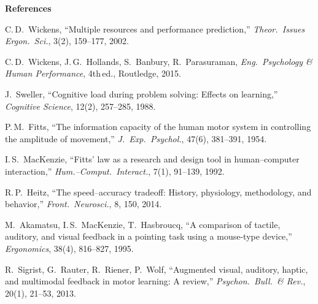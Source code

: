 \documentclass[12pt,letterpaper]{article}
\begin{document}
{\scriptsize\setlength{\parskip}{0pt}%
\textbf{References}\par\vspace{-0.2em}
\begin{enumerate}[label={[\arabic*]},leftmargin=1.5em,itemsep=0pt,parsep=0pt,topsep=0pt]
  \item C.\,D.\ Wickens, ``Multiple resources and performance prediction,'' \emph{Theor.\ Issues Ergon.\ Sci.}, 3(2), 159--177, 2002.
  \item C.\,D.\ Wickens, J.\,G.\ Hollands, S.\ Banbury, R.\ Parasuraman, \emph{Eng.\ Psychology \& Human Performance}, 4th\,ed., Routledge, 2015.
  \item J.\ Sweller, ``Cognitive load during problem solving: Effects on learning,'' \emph{Cognitive Science}, 12(2), 257--285, 1988.
  \item P.\,M.\ Fitts, ``The information capacity of the human motor system in controlling the amplitude of movement,'' \emph{J.\ Exp.\ Psychol.}, 47(6), 381--391, 1954.
  \item I.\,S.\ MacKenzie, ``Fitts' law as a research and design tool in human--computer interaction,'' \emph{Hum.--Comput.\ Interact.}, 7(1), 91--139, 1992.
  \item R.\,P.\ Heitz, ``The speed--accuracy tradeoff: History, physiology, methodology, and behavior,'' \emph{Front.\ Neurosci.}, 8, 150, 2014.
  \item M.\ Akamatsu, I.\,S.\ MacKenzie, T.\ Hasbroucq, ``A comparison of tactile, auditory, and visual feedback in a pointing task using a mouse-type device,'' \emph{Ergonomics}, 38(4), 816--827, 1995.
  \item R.\ Sigrist, G.\ Rauter, R.\ Riener, P.\ Wolf, ``Augmented visual, auditory, haptic, and multimodal feedback in motor learning: A review,'' \emph{Psychon.\ Bull.\ \& Rev.}, 20(1), 21--53, 2013.
\end{enumerate}
}
\end{document}
